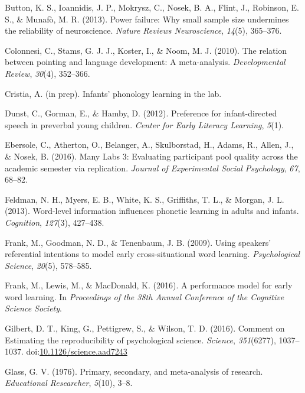 \documentclass[english,floatsintext,man]{apa6}
\theoremstyle{definition}
\theoremstyle{definition}
\theoremstyle{remark}
\begin{document}
\hypertarget{ref-button2013power}{}
Button, K. S., Ioannidis, J. P., Mokrysz, C., Nosek, B. A., Flint, J.,
Robinson, E. S., \& Munafò, M. R. (2013). Power failure: Why small
sample size undermines the reliability of neuroscience. \emph{Nature
Reviews Neuroscience}, \emph{14}(5), 365--376.

\hypertarget{ref-colonnesi2010relation}{}
Colonnesi, C., Stams, G. J. J., Koster, I., \& Noom, M. J. (2010). The
relation between pointing and language development: A meta-analysis.
\emph{Developmental Review}, \emph{30}(4), 352--366.

\hypertarget{ref-cristiastatisticalinprep}{}
Cristia, A. (in prep). Infants' phonology learning in the lab.

\hypertarget{ref-dunst2012preference}{}
Dunst, C., Gorman, E., \& Hamby, D. (2012). Preference for
infant-directed speech in preverbal young children. \emph{Center for
Early Literacy Learning}, \emph{5}(1).

\hypertarget{ref-ebersole2015many}{}
Ebersole, C., Atherton, O., Belanger, A., Skulborstad, H., Adams, R.,
Allen, J., \& Nosek, B. (2016). Many Labs 3: Evaluating participant pool
quality across the academic semester via replication. \emph{Journal of
Experimental Social Psychology}, \emph{67}, 68--82.

\hypertarget{ref-feldman2013word}{}
Feldman, N. H., Myers, E. B., White, K. S., Griffiths, T. L., \& Morgan,
J. L. (2013). Word-level information influences phonetic learning in
adults and infants. \emph{Cognition}, \emph{127}(3), 427--438.

\hypertarget{ref-frank2009using}{}
Frank, M., Goodman, N. D., \& Tenenbaum, J. B. (2009). Using speakers'
referential intentions to model early cross-situational word learning.
\emph{Psychological Science}, \emph{20}(5), 578--585.

\hypertarget{ref-frank2016performance}{}
Frank, M., Lewis, M., \& MacDonald, K. (2016). A performance model for
early word learning. In \emph{Proceedings of the 38th Annual Conference
of the Cognitive Science Society}.

\hypertarget{ref-Gilbert1037}{}
Gilbert, D. T., King, G., Pettigrew, S., \& Wilson, T. D. (2016).
Comment on Estimating the reproducibility of psychological science.
\emph{Science}, \emph{351}(6277), 1037--1037.
doi:\href{https://doi.org/10.1126/science.aad7243}{10.1126/science.aad7243}

\hypertarget{ref-glass1976primary}{}
Glass, G. V. (1976). Primary, secondary, and meta-analysis of research.
\emph{Educational Researcher}, \emph{5}(10), 3--8.
\end{document}
